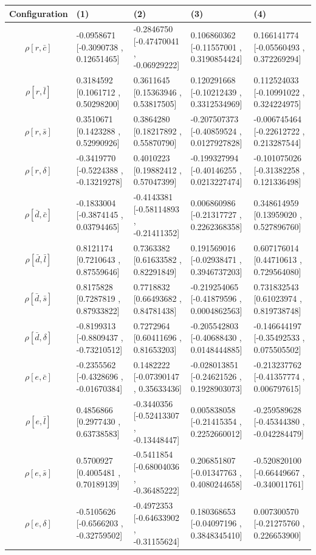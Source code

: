 \begin{center}
\begin{tabular}{|c|p{3.7cm}|p{3.7cm}|p{3.7cm}|p{3.7cm}|}
\hline
Configuration&(1)&(2)&(3)&(4)\\\hline
$\rho[r,\bar{c}]$&-0.0958671 [-0.3090738 , 0.12651465]&-0.2846750 [-0.47470041 , -0.06929222]&0.106860362 [-0.11557001 , 0.3190854424]&0.166141774 [-0.05560493 , 0.372269294]\\
$\rho[r,\bar{l}]$&0.3184592 [0.1061712 , 0.50298200]&0.3611645 [0.15363946 , 0.53817505]&0.120291668 [-0.10212439 , 0.3312534969]&0.112524033 [-0.10991022 , 0.324224975]\\
$\rho[r,\bar{s}]$&0.3510671 [0.1423288 , 0.52990926]&0.3864280 [0.18217892 , 0.55870790]&-0.207507373 [-0.40859524 , 0.0127927828]&-0.006745464 [-0.22612722 , 0.213287544]\\
$\rho[r,\delta]$&-0.3419770 [-0.5224388 , -0.13219278]&0.4010223 [0.19882412 , 0.57047399]&-0.199327994 [-0.40146255 , 0.0213227474]&-0.101075026 [-0.31382258 , 0.121336498]\\
$\rho[\bar{d},\bar{c}]$&-0.1833004 [-0.3874145 , 0.03794465]&-0.4143381 [-0.58114893 , -0.21411352]&0.006860986 [-0.21317727 , 0.2262368358]&0.348614959 [0.13959020 , 0.527896760]\\
$\rho[\bar{d},\bar{l}]$&0.8121174 [0.7210643 , 0.87559646]&0.7363382 [0.61633582 , 0.82291849]&0.191569016 [-0.02938471 , 0.3946737203]&0.607176014 [0.44710613 , 0.729564080]\\
$\rho[\bar{d},\bar{s}]$&0.8175828 [0.7287819 , 0.87933822]&0.7718832 [0.66493682 , 0.84781438]&-0.219254065 [-0.41879596 , 0.0004862563]&0.731832543 [0.61023974 , 0.819738748]\\
$\rho[\bar{d},\delta]$&-0.8199313 [-0.8809437 , -0.73210512]&0.7272964 [0.60411696 , 0.81653203]&-0.205542803 [-0.40688430 , 0.0148444885]&-0.146644197 [-0.35492533 , 0.075505502]\\
$\rho[e,\bar{c}]$&-0.2355562 [-0.4328696 , -0.01670384]&0.1482222 [-0.07390147 , 0.35633436]&-0.028013851 [-0.24621526 , 0.1928903073]&-0.213237762 [-0.41357774 , 0.006797615]\\
$\rho[e,\bar{l}]$&0.4856866 [0.2977430 , 0.63738583]&-0.3440356 [-0.52413307 , -0.13448447]&0.005838058 [-0.21415354 , 0.2252660012]&-0.259589628 [-0.45344380 , -0.042284479]\\
$\rho[e,\bar{s}]$&0.5700927 [0.4005481 , 0.70189139]&-0.5411854 [-0.68004036 , -0.36485222]&0.206851807 [-0.01347763 , 0.4080244658]&-0.520820100 [-0.66449667 , -0.340011761]\\
$\rho[e,\delta]$&-0.5105626 [-0.6566203 , -0.32759502]&-0.4972353 [-0.64633902 , -0.31155624]&0.180368653 [-0.04097196 , 0.3848345410]&0.007300570 [-0.21275760 , 0.226653900]\\

\end{tabular}
\end{center}
